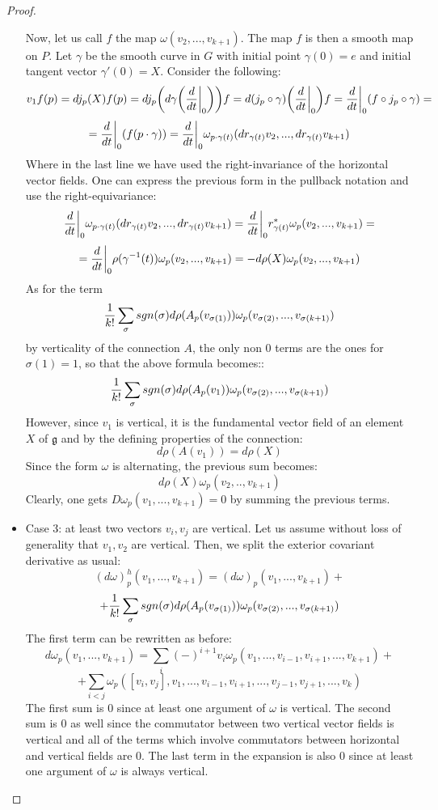 \documentclass[12pt,a4paper]{report}
\theoremstyle{definition}
\theoremstyle{Theorem}
\theoremstyle{definition}
\theoremstyle{definition}
\begin{document}
\begin{proof}
\begin{itemize}
			Now, let us call $f$ the map $\omega(v_2,...,v_{k+1})$. The map $f$ is then a smooth map on $P$. Let $\gamma$ be the smooth curve in $G$ with initial point $\gamma(0)=e$ and initial tangent vector $\gamma'(0)=X$. Consider the following:
			$$v_1f(p)=dj_p(X)f(p)=dj_p\bigg( d\gamma\bigg({d\over dt}\bigg|_0\bigg)\bigg)f=d(j_p\circ \gamma)\bigg({d\over dt}\bigg|_0\bigg)f={d\over dt}\bigg|_0 (f\circ j_p\circ \gamma)=$$
			$$={d\over dt}\bigg|_0(f(p\cdot \gamma))={d\over dt}\bigg|_0\omega_{p\cdot \gamma(t)}(dr_{\gamma(t)}v_2,...,dr_{\gamma(t)}v_{k+1})$$
			Where in the last line we have used the right-invariance of the horizontal vector fields. One can express the previous form in the pullback notation and use the right-equivariance:
			$${d\over dt}\bigg|_0\omega_{p\cdot \gamma(t)}(dr_{\gamma(t)}v_2,...,dr_{\gamma(t)}v_{k+1})={d\over dt}\bigg|_0r^*_{\gamma(t)}\omega_{p}(v_2,...,v_{k+1})=$$
			$$={d\over dt}\bigg|_0\rho(\gamma^{-1}(t))\omega_{p}(v_2,...,v_{k+1})=-d\rho(X)\omega_{p}(v_2,...,v_{k+1})$$
			As for the term
			$${1\over k!}\sum_\sigma sgn(\sigma)d\rho(A_p(v_{\sigma(1)}))\omega_p(v_{\sigma(2)},...,v_{\sigma(k+1)})$$
			by verticality of the connection $A$, the only non 0 terms are the ones for $\sigma(1)=1$, so that the above formula becomes::
			$${1\over k!}\sum_\sigma sgn(\sigma)d\rho(A_p(v_1))\omega_p(v_{\sigma(2)},...,v_{\sigma(k+1)})$$
			However, since $v_1$ is vertical, it is the fundamental vector field of an element $X$ of $\mathfrak{g}$ and by the defining properties of the connection:
			$$d\rho(A(v_1))=d\rho(X)$$
			Since the form $\omega$ is alternating, the previous sum becomes:
			$$d\rho(X)\omega_p(v_2,..,v_{k+1})$$
			Clearly, one gets $D\omega_p(v_1,...,v_{k+1})=0$ by summing the previous terms.
			\item Case 3: at least two vectors $v_i,v_j$ are vertical. Let us assume without loss of generality that $v_1,v_2$ are vertical. Then, we split the exterior covariant derivative as usual:
			$$(d\omega)^h_p(v_1,...,v_{k+1})=(d\omega)_p(v_1,...,v_{k+1})+$$$$+{1\over k!}\sum_\sigma sgn(\sigma)d\rho(A_p(v_{\sigma(1)}))\omega_p(v_{\sigma(2)},...,v_{\sigma(k+1)})$$
			The first term can be rewritten as before:
			$$d\omega_p(v_1,...,v_{k+1})=\sum_i (-)^{i+1}v_i\omega_p(v_1,...,v_{i-1},v_{i+1},...,v_{k+1})+$$
			$$+\sum_{i<j}\omega_p([v_i,v_j],v_1,...,v_{i-1},v_{i+1},...,v_{j-1},v_{j+1},...,v_k)$$
			The first sum is 0 since at least one argument of $\omega$ is vertical. The second sum is 0 as well since the commutator between two vertical vector fields is vertical and all of the terms which involve commutators between horizontal and vertical fields are 0.
			The last term in the expansion is also 0 since at least one argument of $\omega$ is always vertical.
		\end{itemize}
	\end{proof}
\end{document}
